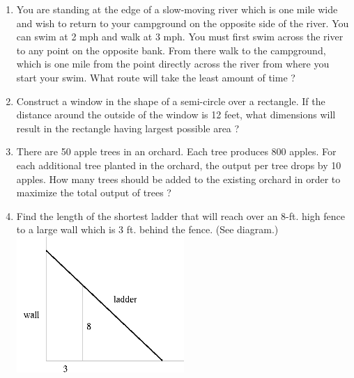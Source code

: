 \documentclass{article}
\begin{document}
\begin{enumerate}
    \item You are standing at the edge of a slow-moving river which is one mile wide and wish to return to your campground on the opposite side of the river. You can swim at 2 mph and walk at 3 mph. You must first swim across the river to any point on the opposite bank. From there walk to the campground, which is one mile from the point directly across the river from where you start your swim. What route will take the least amount of time ?
    \item Construct a window in the shape of a semi-circle over a rectangle. If the distance around the outside of the window is 12 feet, what dimensions will result in the rectangle having largest possible area ?
    \item There are 50 apple trees in an orchard. Each tree produces 800 apples. For each additional tree planted in the orchard, the output per tree drops by 10 apples. How many trees should be added to the existing orchard in order to maximize the total output of trees ?
    \item Find the length of the shortest ladder that will reach over an 8-ft. high fence to a large wall which is 3 ft. behind the fence. (See diagram.)\\
    \includegraphics[width=0.5\textwidth]{MaxMin18A}
\end{enumerate}
\end{document}
